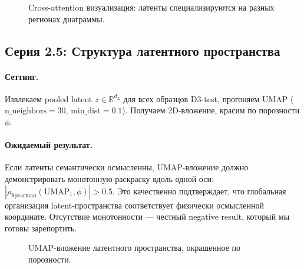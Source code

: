 \begin{figure}[ht]
\centering
{}
\caption{Cross-attention визуализация: латенты специализируются на разных регионах диаграммы.}
\label{fig:cross-attn}
\end{figure}

\subsection{Серия 2.5: Структура латентного пространства}
\label{ssec:exp-umap}

\paragraph{Сеттинг.} Извлекаем pooled latent $z \in \mathbb{R}^{d_L}$ для всех образцов D3-test, прогоняем UMAP ($\text{n\_neighbors}=30$, $\text{min\_dist}=0.1$). Получаем 2D-вложение, красим по порозности $\phi$.

\paragraph{Ожидаемый результат.} Если латенты семантически осмысленны, UMAP-вложение должно демонстрировать монотонную раскраску вдоль одной оси: $|\rho_\text{Spearman}(\text{UMAP}_1, \phi)| > 0.5$. Это качественно подтверждает, что глобальная организация latent-пространства соответствует физически осмысленной координате. Отсутствие монотонности --- честный negative result, который мы готовы зарепортить.

\begin{figure}[ht]
\centering
{}
\caption{UMAP-вложение латентного пространства, окрашенное по порозности.}
\label{fig:umap}
\end{figure}

